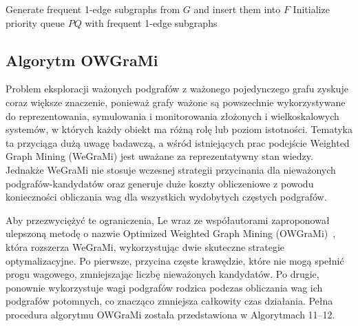\begin{algorithm}[!htb]
\LinesNumbered
{}

\BlankLine

Generate frequent 1-edge subgraphs from $G$ and insert them into $F$ \;
Initialize priority queue $PQ$ with frequent 1-edge subgraphs \;


\caption{\textbf{GRAMI} algorithm (Graph Mining via Efficient Candidate Generation)}
\label{alg:grami}
\end{algorithm}


\subsection{Algorytm OWGraMi}
Problem eksploracji ważonych podgrafów z ważonego pojedynczego grafu zyskuje coraz większe znaczenie, ponieważ grafy ważone są powszechnie wykorzystywane do reprezentowania, symulowania i monitorowania złożonych i wielkoskalowych systemów, w których każdy obiekt ma różną rolę lub poziom istotności. Tematyka ta przyciąga dużą uwagę badawczą, a wśród istniejących prac podejście Weighted Graph Mining (WeGraMi) jest uważane za reprezentatywny stan wiedzy. Jednakże WeGraMi nie stosuje wczesnej strategii przycinania dla nieważonych podgrafów-kandydatów oraz generuje duże koszty obliczeniowe z powodu konieczności obliczania wag dla wszystkich wydobytych częstych podgrafów.

Aby przezwyciężyć te ograniczenia, Le wraz ze współautorami zaproponował ulepszoną metodę o nazwie Optimized Weighted Graph Mining (OWGraMi)~\cite{le2022owgrami}, która rozszerza WeGraMi, wykorzystując dwie skuteczne strategie optymalizacyjne. Po pierwsze, przycina częste krawędzie, które nie mogą spełnić progu wagowego, zmniejszając liczbę nieważonych kandydatów. Po drugie, ponownie wykorzystuje wagi podgrafów rodzica podczas obliczania wag ich podgrafów potomnych, co znacząco zmniejsza całkowity czas działania. Pełna procedura algorytmu OWGraMi została przedstawiona w Algorytmach 11–12.


